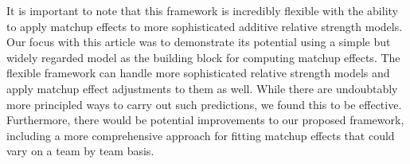 \documentclass[letterpaper,12pt]{article}
\begin{document}
It is important to note that this framework is incredibly flexible with the ability to apply matchup effects to more sophisticated additive relative strength models. Our focus with this article was to demonstrate its potential using a simple but widely regarded model as the building block for computing matchup effects. The flexible framework can handle more sophisticated relative strength models and apply matchup effect adjustments to them as well. While there are undoubtably more principled ways to carry out such predictions, we found this to be effective. Furthermore, there would be potential improvements to our proposed framework, including a more comprehensive approach for fitting matchup effects that could vary on a team by team basis.


\end{document}
